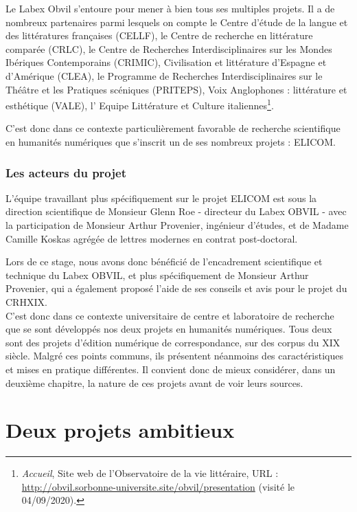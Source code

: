 Le Labex Obvil s'entoure pour mener à bien tous ses multiples projets. Il a de nombreux partenaires parmi lesquels on compte le Centre d'étude de la langue et des littératures françaises (CELLF), le Centre de recherche en littérature comparée (CRLC), le Centre de Recherches Interdisciplinaires sur les Mondes Ibériques Contemporains (CRIMIC),  Civilisation et littérature d’Espagne et d’Amérique (CLEA), le Programme de Recherches Interdisciplinaires sur le Théâtre et les Pratiques scéniques (PRITEPS), Voix Anglophones : littérature et esthétique (VALE), l' Equipe Littérature et Culture italiennes\footnote{\emph{Accueil}, Site web de l'Observatoire de la vie littéraire, URL : \url{http://obvil.sorbonne-universite.site/obvil/presentation} (visité le 04/09/2020).}.

C'est donc dans ce contexte particulièrement favorable de recherche scientifique en humanités numériques que s'inscrit un de ses nombreux projets : ELICOM.

\subsection{Les acteurs du projet}

L'équipe travaillant plus spécifiquement sur le projet ELICOM est sous la direction scientifique de Monsieur Glenn Roe - directeur du Labex OBVIL - avec la participation de Monsieur Arthur Provenier, ingénieur d'études, et de Madame Camille Koskas agrégée de lettres modernes en contrat post-doctoral. 

Lors de ce stage, nous avons donc bénéficié de l'encadrement scientifique et technique du Labex OBVIL, et plus spécifiquement de Monsieur Arthur Provenier, qui a également proposé l'aide de ses conseils et avis pour le projet du CRHXIX.\\

C'est donc dans ce contexte universitaire de centre et laboratoire de recherche que se sont développés nos deux projets en humanités numériques. Tous deux sont des projets d'édition numérique de correspondance, sur des corpus du XIX siècle. Malgré ces points communs, ils présentent néanmoins des caractéristiques et mises en pratique différentes. Il convient donc de mieux considérer, dans un deuxième chapitre, la nature de ces projets avant de voir leurs sources.




\chapter{Deux projets ambitieux}

